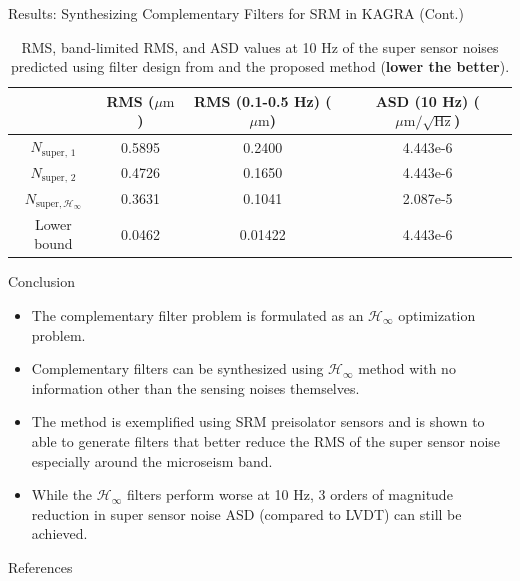 \documentclass{beamer}
\begin{document}
\begin{frame}[t]
\begin{columns}[t]
\begin{column}{0.32\linewidth}
\begin{block}{Results: Synthesizing Complementary Filters for SRM in KAGRA (Cont.)}
			\begin{table}
				\begin{tabular}{|c|c|c|c|}
					\hline
					& RMS ($\mu\text{m}$) & RMS (0.1-0.5 Hz) ($\mu\text{m}$)& ASD (10 Hz) ($\mu\text{m}/\sqrt{\text{Hz}}$)\\
					\hline
					$N_\text{super, 1}$ & 0.5895 & 0.2400 & 4.443e-6\\
					\hline
					$N_\text{super, 2}$ & 0.4726 & 0.1650 & 4.443e-6\\
					\hline
					$N_{\text{super}, \mathcal{H}_\infty}$ & 0.3631 & 0.1041 & 2.087e-5\\
					\hline
					Lower bound & 0.0462 & 0.01422 & 4.443e-6\\
					\hline
				\end{tabular}
				\caption{RMS, band-limited RMS, and ASD values at 10 Hz of the super sensor noises predicted using filter design from \cite{Sekiguchi:2016bmv,vanHeijningen:2018cpc} and the proposed method (\textbf{lower the better}).}
				\label{table:metrics}
			\end{table}

			\end{block}
			\begin{block}{Conclusion}
				\begin{itemize}
					\item The complementary filter problem is formulated as an $\mathcal{H}_\infty$ optimization problem.
					\item Complementary filters can be synthesized using $\mathcal{H}_\infty$ method with no information other than the sensing noises themselves.
					\item The method is exemplified using SRM preisolator sensors and is shown to able to generate filters that better reduce the RMS of the super sensor noise especially around the microseism band.
					\item While the $\mathcal{H}_\infty$ filters perform worse at 10 Hz, 3 orders of magnitude reduction in super sensor noise ASD (compared to LVDT) can still be achieved.
				\end{itemize}
			\end{block}
			\begin{block}{References}
				
				
			\end{block}
		\end{column}
	\end{columns}
\end{frame}
\end{document}

